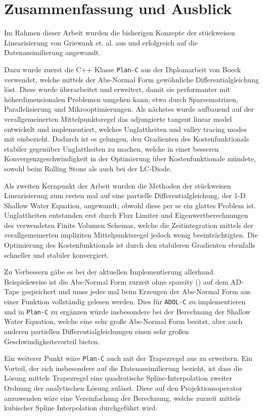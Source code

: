 \chapter{Zusammenfassung und Ausblick}

Im Rahmen dieser Arbeit wurden die bisherigen Konzepte der stückweisen Linearisierung von Griewank et. al. aus \cite{monster} und \cite{plan} erfolgreich auf die Datenassimilierung angewandt.

Dazu wurde zuerst die C++ Klasse \texttt{Plan-C} aus der Diplomarbeit von Boeck \cite{boeck14} verwendet, welche mittels der Abs-Normal Form gewöhnliche Differentialgleichung löst. Diese wurde überarbeitet und erweitert, damit sie performanter mit höherdimensionalen Problemen umgehen kann, etwa durch Sparsematrizen, Parallelisierung und Mikrooptimierungen. Als nächstes wurde aufbauend auf der verallgemeinerten Mittelpunktsregel das adjungierte tangent linear model entwickelt und implementiert, welches Unglattheiten und valley tracing modes mit einbezieht. Dadurch ist es gelungen, den Gradienten des Kostenfunktionals stabiler gegenüber Unglattheiten zu machen, welche in einer besseren Konvergenzgeschwindigkeit in der Optimierung über Kostenfunktionale mündete, sowohl beim Rolling Stone als auch bei der LC-Diode.

Als zweiten Kernpunkt der Arbeit wurden die Methoden der stückweisen Linearisierung zum ersten mal auf eine partielle Differentialgleichung, der 1-D Shallow Water Equation, angewandt, obwohl diese per se ein glattes Problem ist. Unglattheiten entstanden erst durch Flux Limiter und Eigenwertberechnungen des verwendeten Finite Volumen Schemas, welche die Zeitintegration mittels der verallgemeinerten impliziten Mittelpunktsregel jedoch wenig beeinträchtigten. Die Optimierung des Kostenfunktionals ist durch den stabileren Gradienten ebenfalls schneller und stabiler konvergiert.

Zu Verbessern gäbe es bei der aktuellen Implementierung allerhand. Beispielsweise ist die Abs-Normal Form zurzeit ohne sparsity (\cite[S.137 ff.]{griewank2008evaluating}) auf dem AD-Tape gespeichert und muss jedes mal beim Erzeugen der Abs-Normal Form aus einer Funktion vollständig gelesen werden. Dies für \texttt{ADOL-C} zu implementieren und in \texttt{Plan-C} zu ergänzen  würde insbesondere bei der Berechnung der Shallow Water Equation, welche eine sehr große Abs-Normal Form besitzt, aber auch anderen partiellen Differentialgleichungen einen sehr großen Geschwindigkeitsvorteil bieten. 

Ein weiterer Punkt wäre \texttt{Plan-C} auch mit der Trapezregel aus \cite[S.23 (15)]{monster} zu erweitern. Ein Vorteil, der sich insbesondere auf die Datenassimilierung bezieht, ist dass die Lösung mittels Trapezregel eine quadratische Spline-Interpolation zweiter Ordnung der analytischen Lösung zulässt. Diese auf den Projektionsoperator anzuwenden wäre eine Vereinfachung der Berechnung, welche zurzeit mittels kubischer Spline Interpolation durchgeführt wird.

